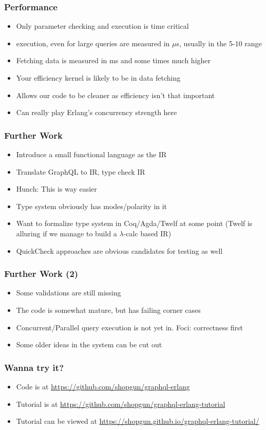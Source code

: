 \documentclass[lualatex]{beamer}
\begin{document}
\begin{frame}
  \frametitle{Performance}
  \begin{itemize}
  \item Only parameter checking and execution is time critical
  \item execution, even for large queries are measured in $\mu{}$s,
    usually in the 5-10 range
  \item Fetching data is measured in ms and some times much higher
  \item Your efficiency kernel is likely to be in data fetching
  \item Allows our code to be cleaner as efficiency isn't that
    important
  \item Can really play Erlang's concurrency strength here
  \end{itemize}
\end{frame}

\begin{frame}
  \frametitle{Further Work}
  \begin{itemize}
  \item Introduce a small functional language as the IR
  \item Translate GraphQL to IR, type check IR
  \item Hunch: This is way easier
  \item Type system obviously has modes/polarity in it
  \item Want to formalize type system in Coq/Agda/Twelf at some point
    (Twelf is alluring if we manage to build a $\lambda{}$-calc based IR)
  \item QuickCheck approaches are obvious candidates for testing as well
  \end{itemize}
\end{frame}

\begin{frame}
  \frametitle{Further Work (2)}
  \begin{itemize}
  \item Some validations are still missing
  \item The code is somewhat mature, but has failing corner cases
  \item Concurrent/Parallel query execution is not yet in. Foci:
    correctness first
  \item Some older ideas in the system can be cut out
  \end{itemize}
\end{frame}

\begin{frame}
  \frametitle{Wanna try it?}
  \begin{itemize}
  \item Code is at \url{https://github.com/shopgun/graphql-erlang}
  \item Tutorial is at
    \url{https://github.com/shopgun/graphql-erlang-tutorial}
  \item Tutorial can be viewed at
    \url{https://shopgun.github.io/graphql-erlang-tutorial/}
  \end{itemize}
\end{frame}
\end{document}
